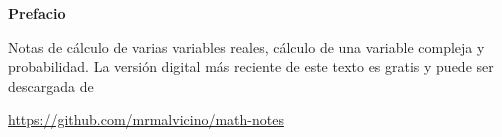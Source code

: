 \clearpage
\noindent
\textbf{Prefacio}

Notas de cálculo de varias variables reales, cálculo de una variable compleja y probabilidad.
La versión digital más reciente de este texto es gratis y puede ser descargada de
\begin{center}
    \small
    \url{https://github.com/mrmalvicino/math-notes}
\end{center}